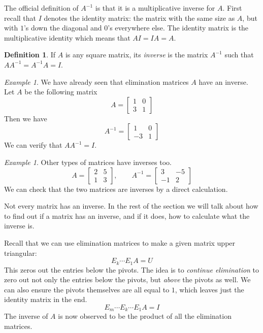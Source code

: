 \documentclass[11pt,oneside]{amsbook}
\theoremstyle{definition}
\theoremstyle{plain}
\theoremstyle{definition}
\newtheorem{definition}[theorem]{Definition}
\theoremstyle{remark}
\newtheorem{example}[theorem]{Example}
\numberwithin{equation}{section}
\numberwithin{figure}{section}
\begin{document}
The official definition of $A^{-1}$ is that it is a multiplicative inverse for $A$. First recall that $I$ denotes the identity matrix: the matrix with the same size as $A$, but with $1$'s down the diagonal and $0$'s everywhere else. The identity matrix is the multiplicative identity which means that $AI=IA=A$.

\begin{definition}
  If $A$ is any square matrix, its \emph{inverse} is the matrix $A^{-1}$ such that $AA^{-1}=A^{-1}A=I$.
\end{definition}

\begin{example}
  We have already seen that elimination matrices $A$ have an inverse. Let $A$ be the following matrix
  \[A=\begin{bmatrix}1&0\\3&1\end{bmatrix}
  \]
  Then we have
  \[A^{-1}=\begin{bmatrix}1&0\\-3&1\end{bmatrix}
  \]
  We can verify that $AA^{-1}=I$.
\end{example}

\begin{example}
  Other types of matrices have inverses too.
  \[A=\begin{bmatrix}2&5\\1&3\end{bmatrix},\qquad
    A^{-1}=\begin{bmatrix}3&-5\\-1&2\end{bmatrix}
  \]
  We can check that the two matrices are inverses by a direct calculation.
\end{example}


Not every matrix has an inverse. In the rest of the section we will talk about how to find out if a matrix has an inverse, and if it does, how to calculate what the inverse is.

Recall that we can use elimination matrices to make a given matrix upper triangular:
\[E_k\cdots E_1A=U
\]
This zeros out the entries below the pivots. The idea is to \emph{continue elimination} to zero out not only the entries below the pivots, but \emph{above} the pivots as well. We can also ensure the pivots themselves are all equal to $1$, which leaves just the identity matrix in the end.
\[E_m\cdots E_k\cdots E_1A=I
\]
The inverse of $A$ is now observed to be the product of all the elimination matrices.
\end{document}
